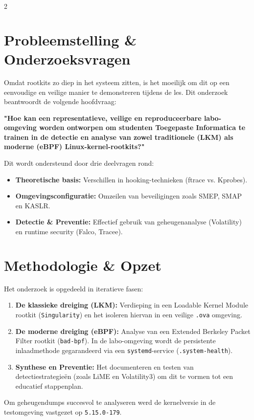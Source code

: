 \documentclass[a0,portrait]{hogent-poster}
\begin{document}
    \begin{multicols}{2} %
        
        \section{Probleemstelling \& Onderzoeksvragen}
        Omdat rootkits zo diep in het systeem zitten, is het moeilijk om dit op een eenvoudige en veilige manier te demonstreren tijdens de les. Dit onderzoek beantwoordt de volgende hoofdvraag:
        
        \textbf{"Hoe kan een representatieve, veilige en reproduceerbare labo-omgeving worden ontworpen om studenten Toegepaste Informatica te trainen in de detectie en analyse van zowel traditionele (LKM) als moderne (eBPF) Linux-kernel-rootkits?"}
        
        Dit wordt ondersteund door drie deelvragen rond:
        \begin{itemize}
            \item \textbf{Theoretische basis:} Verschillen in hooking-technieken (ftrace vs. Kprobes).
            \item \textbf{Omgevingsconfiguratie:} Omzeilen van beveiligingen zoals SMEP, SMAP en KASLR.
            \item \textbf{Detectie \& Preventie:} Effectief gebruik van geheugenanalyse (Volatility) en runtime security (Falco, Tracee).
        \end{itemize}
        
        \section{Methodologie \& Opzet}
        Het onderzoek is opgedeeld in iteratieve fasen:
        \begin{enumerate}
            \item \textbf{De klassieke dreiging (LKM):} Verdieping in een Loadable Kernel Module rootkit (\texttt{Singularity}) en het isoleren hiervan in een veilige \texttt{.ova} omgeving.
            \item \textbf{De moderne dreiging (eBPF):} Analyse van een Extended Berkeley Packet Filter rootkit (\texttt{bad-bpf}). In de labo-omgeving wordt de persistente inlaadmethode gegarandeerd via een \texttt{systemd}-service (\texttt{.system-health}).
            \item \textbf{Synthese en Preventie:} Het documenteren en testen van detectiestrategieën (zoals LiME en Volatility3) om dit te vormen tot een educatief stappenplan.
        \end{enumerate}
        Om geheugendumps succesvol te analyseren werd de kernelversie in de testomgeving vastgezet op \texttt{5.15.0-179}.
        

\end{multicols}
\end{document}

